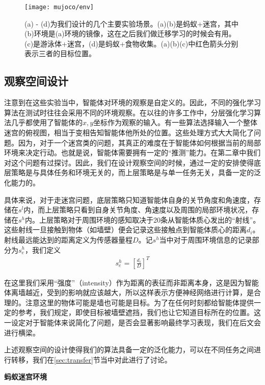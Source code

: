 	\begin{figure}[h] %
        \centering
        \texttt{[image: mujoco/env]}
        \caption{(a) - (d)为我们设计的几个主要实验场景。(a)(b)是蚂蚁+迷宫，其中(b)环境是(a)环境的镜像，这在之后我们做迁移学习的时候会有用。(c)是游泳体+迷宫，(d)是蚂蚁+食物收集。(a)(b)(c)中红色箭头分别表示三者的目标位置。}
        \label{fig:exp_overview}
    \end{figure}

\subsection{观察空间设计}
注意到在这些实验当中，智能体对环境的观察是自定义的。因此，不同的强化学习算法在测试时往往会采用不同的环境观察。在以往的许多工作中，分层强化学习算法几乎都使用了智能体的$x, y$坐标作为观察的输入。有一些算法选择输入一个整体迷宫的俯视图，相当于变相告知智能体他所处的位置。这些处理方式大大简化了问题。因为，对于一个迷宫类的问题，其真正的难度在于智能体如何根据当前的局部环境来决定行动。也就是说，智能体需要拥有一定的``推测''能力。在第二章中我们对这个问题有过探讨。因此，我们在设计观察空间的时候，通过一定的安排使得底层策略是与具体任务和环境无关的，而上层策略是与单一任务无关，具备一定的泛化能力的。

具体来说，对于走迷宫问题，底层策略只知道智能体自身的关节角度和角速度，存储在$s^l$内，而上层策略只看到自身关节角度、角速度以及周围的局部环境状况，存储在$s^h$内。上层策略对于周围环境的感知取决于20条从智能体质心发出的``射线''。这些射线一旦接触到物体（如墙壁）便会记录这些接触点到智能体质心的距离$d_i$。射线最远能达到的距离定义为传感器量程$D$。记$s^h$当中对于周围环境信息的记录部分为$s^h_e$，我们定义
\begin{align}
  s^h_e = [\frac{d_i}{D}]^T
\end{align}

在这里我们采用``强度''（intensity）作为距离的表征而非距离本身，这是因为智能体离墙越近，受到的影响就应该越大，所以这样表示方便神经网络进行计算，是合理的。注意这里的物体可能是墙也可能是目标。为了在任何时刻都给智能体提供一定的参考，我们规定，即使目标被墙壁遮挡，我们也让它知道目标所在的位置。这一设定对于智能体来说简化了问题，是否会显著影响最终学习表现，我们在后文会进行横梁。

上述观察空间的设计使得我们的算法具备一定的泛化能力，可以在不同任务之间进行转移，我们在\ref{sec:transfer}节当中对此进行了讨论。

\vspace{0.5cm}
\textbf{蚂蚁迷宫环境}

